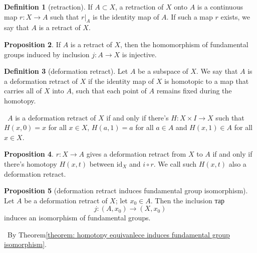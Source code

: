 \documentclass[12pt,a4paper]{book}
\newenvironment{prooff}{{\noindent\it\textcolor{cyan!40!black}{Proof}:}\,}{\par}
\theoremstyle{definition}
\newtheorem{defn}{Definition}[section]
\newtheorem{prop}[defn]{Proposition}
\begin{document}




\begin{defn}[retraction]
    If $A \subset X$, a retraction of $X$ onto $A$ is a continuous map $r: X \rightarrow A$ such that $r|_A$ is the identity map of $A$. If such a map $r$ exists, we say that $A$ is a retract of $X$.
\end{defn}
\begin{prop}
    If $A$ is a retract of $X$, then the homomorphism of fundamental groups induced by inclusion $j: A \rightarrow X$ is injective.
    \label{proposition:retraction induce injective homomorphism}
\end{prop}
\begin{defn}[deformation retract]
    Let $A$ be a subspace of $X$. We say that $A$ is a deformation retract of $X$
    if the identity map of $X$ is homotopic to
    a map that carries all of $X$ into $A$, such that each point of $A$ remains
    fixed during the homotopy.
\end{defn}
\begin{prooff}
    $A$ is a deformation retract of $X$ if and only if there's $H:X\times I\rightarrow X$
    such that $H(x,0)=x$ for all $x\in X$, $H(a,1)=a$ for all $a\in A$ and $H(x,1)\in A$ for all $x\in X$.
\end{prooff}
\begin{prop}
    $r:X\rightarrow A$ gives a deformation retract from $X$ to $A$ if and only if there's homotopy $H(x,t)$ between $\text{id}_X$ and $i\circ r$.
    We call such $H(x,t)$ also a deformation retract.
\end{prop}
\begin{prop}[deformation retract induces fundamental group isomorphism]
    Let $A$ be a deformation retract of $X$; let $x_0 \in A$. Then the inclusion тар
    $$
        j:\left(A, x_0\right) \rightarrow\left(X, x_0\right)
    $$
    induces an isomorphism of fundamental groups.
\end{prop}
\begin{prooff}
    By Theorem\ref{theorem: homotopy equivanlece induces fundamental group isomorphism}.
\end{prooff}
\end{document}
